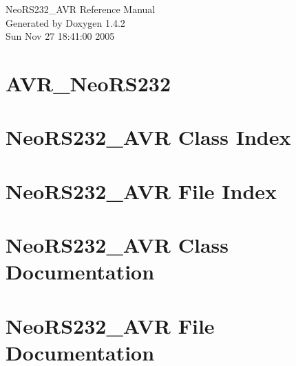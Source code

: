 \documentclass[a4paper]{book}
\begin{document}
\begin{titlepage}
\vspace*{7cm}
\begin{center}
{\Large Neo\-RS232\_\-AVR Reference Manual}\\
\vspace*{1cm}
{\large Generated by Doxygen 1.4.2}\\
\vspace*{0.5cm}
{\small Sun Nov 27 18:41:00 2005}\\
\end{center}
\end{titlepage}
\clearemptydoublepage
{}
\tableofcontents
\clearemptydoublepage
{}
\chapter{AVR\_\-Neo\-RS232 }
\label{index}\hypertarget{index}{}
\chapter{Neo\-RS232\_\-AVR Class Index}

\chapter{Neo\-RS232\_\-AVR File Index}

\chapter{Neo\-RS232\_\-AVR Class Documentation}


\chapter{Neo\-RS232\_\-AVR File Documentation}








\printindex
\end{document}
